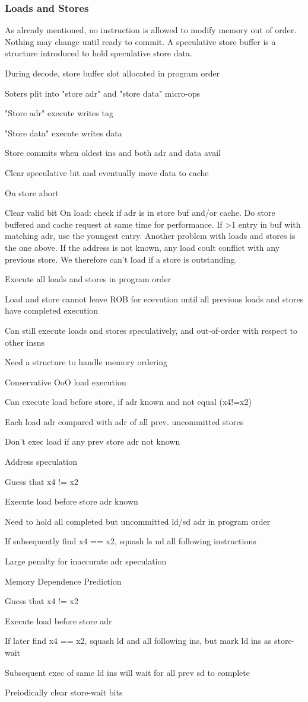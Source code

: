 \documentclass[a4paper, fontsize=8pt, landscape, DIV=1]{scrartcl}
\makeatletter
\renewenvironment{outline}[1][]{%
  \ifthenelse{\equal{#1}{}}{}{\renewcommand{\ol@type}{#1}}%
  \ol@z%
  \newcommand{\0}{\ol@toz\ol@z}%
  \newcommand{\1}{\vspace{\dimexpr\outlinespacingscalar\baselineskip-\baselineskip}\ol@toi\ol@i\item}%
  \newcommand{\2}{\vspace{\dimexpr\outlinespacingscalartwo\baselineskip-\baselineskip}\ol@toii\ol@ii\item}%
  \newcommand{\3}{\vspace{\dimexpr\outlinespacingscalar\baselineskip-\baselineskip}\ol@toiii\ol@iii\item}%
  \newcommand{\4}{\vspace{\dimexpr\outlinespacingscalar\baselineskip-\baselineskip}\ol@toiiii\ol@iiii\item}%
}{%
  \ol@toz\ol@exit%
}
\def\outlinespacingscalar{0.5}
\def\outlinespacingscalartwo{0.5}
\makeatother
\begin{document}
\begin{multicols*}{4}
  \subsubsection{Loads and Stores}
  As already mentioned, no instruction is allowed to modify memory out of order. Nothing
  may change until ready to commit. A speculative store buffer is a structure introduced to hold
  speculative store data. 
  \begin{outline}
    \1 During decode, store buffer slot allocated in program order
    \1 Soters plit into "store adr" and "store data" micro-ops
    \1 "Store adr" execute writes tag
    \1 "Store data" execute writes data
    \1 Store commits when oldest ins and both adr and data avail
      \2 Clear speculative bit and eventually move data to cache
    \1 On store abort
      \2 Clear valid bit
  \end{outline}
  On load: check if adr is in store buf and/or cache. Do store buffered and cache request
  at same time for performance. If >1 entry in buf with matching adr, use the youngest entry.
  Another problem with loads and stores is the one above. If the address is not known, any
  load coult conflict with any previous store. We therefore can't load if a store is outstanding.
  \begin{outline}
    \1 Execute all loads and stores in program order
      \2 Load and store cannot leave ROB for ecevution until all previous loads and stores
      have completed execution
    \1 Can still execute loads and stores speculatively, and out-of-order with respect to other
    insns
    \1 Need a structure to handle memory ordering
    \1 Conservative OoO load execution
      \2 Can execute load before store, if adr known and not equal (x4!=x2)
      \2 Each load adr compared with adr of all prev. uncommitted stores
      \2 Don't exec load if any prev store adr not known
    \1 Address speculation
      \2 Guess that x4 != x2
      \2 Execute load before store adr known
      \2 Need to hold all completed but uncommitted ld/sd adr in program order
      \2 If subsequently find x4 == x2, squash ls nd all following instructions
      \2 Large penalty for inaccurate adr speculation
    \1 Memory Dependence Prediction
      \2 Guess that x4 != x2
      \2 Execute load before store adr
      \2 If later find x4 == x2, squash ld and all following ins, but mark ld ins as store-wait
      \2 Subsequent exec of same ld ins will wait for all prev sd to complete
      \2 Preiodically clear store-wait bits


\end{outline}
\end{multicols*}
\end{document}
